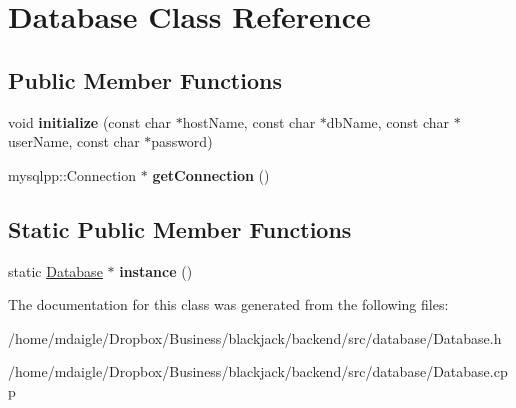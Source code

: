 \hypertarget{classDatabase}{
\section{\-Database \-Class \-Reference}
\label{de/d03/classDatabase}
}
\subsection*{\-Public \-Member \-Functions}
\begin{DoxyCompactItemize}
\item 
\hypertarget{classDatabase_a3843f837fbcd5216be140b20535435f4}{
void {\bfseries initialize} (const char $\ast$host\-Name, const char $\ast$db\-Name, const char $\ast$user\-Name, const char $\ast$password)}
\label{de/d03/classDatabase_a3843f837fbcd5216be140b20535435f4}

\item 
\hypertarget{classDatabase_a0e87253f51483ac02170577e90f23973}{
mysqlpp\-::\-Connection $\ast$ {\bfseries get\-Connection} ()}
\label{de/d03/classDatabase_a0e87253f51483ac02170577e90f23973}

\end{DoxyCompactItemize}
\subsection*{\-Static \-Public \-Member \-Functions}
\begin{DoxyCompactItemize}
\item 
\hypertarget{classDatabase_aa334760d1e18f82a344fb696547bfa5c}{
static \hyperlink{classDatabase}{\-Database} $\ast$ {\bfseries instance} ()}
\label{de/d03/classDatabase_aa334760d1e18f82a344fb696547bfa5c}

\end{DoxyCompactItemize}


\-The documentation for this class was generated from the following files\-:\begin{DoxyCompactItemize}
\item 
/home/mdaigle/\-Dropbox/\-Business/blackjack/backend/src/database/\-Database.\-h\item 
/home/mdaigle/\-Dropbox/\-Business/blackjack/backend/src/database/\-Database.\-cpp\end{DoxyCompactItemize}
